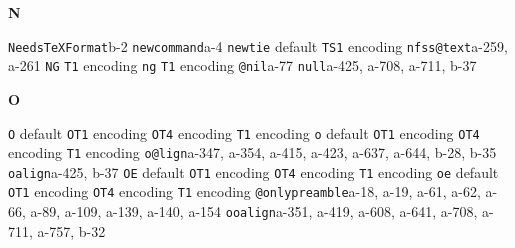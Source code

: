 \documentclass[twoside]{ltxdoc}
\makeatletter
\renewenvironment{theindex}{%
   \@restonecoltrue
   \if@twocolumn\@restonecolfalse\fi
   \columnseprule \z@
   \columnsep 35\p@
   \twocolumn[\index@prologue]%
   \IndexParms
   \let\item\@idxitem
   \ignorespaces
}{\if@restonecol\onecolumn\else\clearpage\fi}
\makeatother
\begin{document}
\begin{theindex}
  \indexspace
{\bfseries\hfil N\hfil}\nopagebreak

  \item \texttt  {NeedsTeXFormat}\pfill b-2
  \item \texttt  {newcommand}\pfill a-4
  \item \texttt  {newtie}\efill 
    \subitem default\pfill {}
    \subitem \texttt  {TS1} encoding\pfill {}
  \item \texttt  {nfss@text}\pfill a-259, a-261
  \item \texttt  {NG}\efill 
    \subitem \texttt  {T1} encoding\pfill {}
  \item \texttt  {ng}\efill 
    \subitem \texttt  {T1} encoding\pfill {}
  \item \texttt  {@nil}\pfill a-77
  \item \texttt  {null}\pfill a-425, a-708, a-711, b-37

  \indexspace
{\bfseries\hfil O\hfil}\nopagebreak

  \item \texttt  {O}\efill 
    \subitem default\pfill {}
    \subitem \texttt  {OT1} encoding\pfill {}
    \subitem \texttt  {OT4} encoding\pfill {}
    \subitem \texttt  {T1} encoding\pfill {}
  \item \texttt  {o}\efill 
    \subitem default\pfill {}
    \subitem \texttt  {OT1} encoding\pfill {}
    \subitem \texttt  {OT4} encoding\pfill {}
    \subitem \texttt  {T1} encoding\pfill {}
  \item \texttt  {o@lign}\pfill a-347, a-354, a-415, 
                a-423, a-637, a-644, b-28, b-35
  \item \texttt  {oalign}\pfill a-425, b-37
  \item \texttt  {OE}\efill 
    \subitem default\pfill {}
    \subitem \texttt  {OT1} encoding\pfill {}
    \subitem \texttt  {OT4} encoding\pfill {}
    \subitem \texttt  {T1} encoding\pfill {}
  \item \texttt  {oe}\efill 
    \subitem default\pfill {}
    \subitem \texttt  {OT1} encoding\pfill {}
    \subitem \texttt  {OT4} encoding\pfill {}
    \subitem \texttt  {T1} encoding\pfill {}
  \item \texttt  {@onlypreamble}\pfill a-18, a-19, 
                a-61, a-62, a-66, a-89, a-109, a-139, a-140, a-154
  \item \texttt  {ooalign}\pfill a-351, a-419, a-608, 
                a-641, a-708, a-711, a-757, b-32


\end{theindex}
\end{document}
